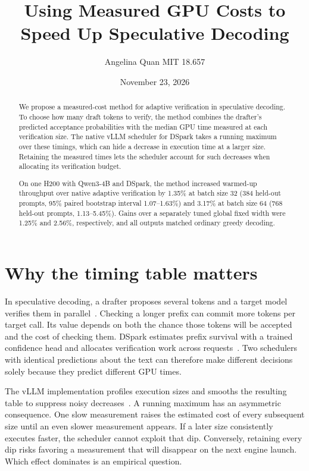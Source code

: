 \documentclass[11pt]{article}
\title{Using Measured GPU Costs to Speed Up Speculative Decoding}
\author{Angelina Quan \qquad MIT 18.657}
\date{November 23, 2026}
\begin{document}
\maketitle
\begin{abstract}
We propose a measured-cost method for adaptive verification in speculative decoding. To choose how many draft tokens to verify, the method combines the drafter's predicted acceptance probabilities with the median GPU time measured at each verification size. The native vLLM scheduler for DSpark takes a running maximum over these timings, which can hide a decrease in execution time at a larger size. Retaining the measured times lets the scheduler account for such decreases when allocating its verification budget.

On one H200 with Qwen3-4B and DSpark, the method increased warmed-up throughput over native adaptive verification by 1.35\% at batch size 32 (384 held-out prompts, 95\% paired bootstrap interval 1.07--1.63\%) and 3.17\% at batch size 64 (768 held-out prompts, 1.13--5.45\%). Gains over a separately tuned global fixed width were 1.25\% and 2.56\%, respectively, and all outputs matched ordinary greedy decoding.
\end{abstract}
\section{Why the timing table matters}
In speculative decoding, a drafter proposes several tokens and a target model verifies them in parallel~\cite{leviathan}. Checking a longer prefix can commit more tokens per target call. Its value depends on both the chance those tokens will be accepted and the cost of checking them. DSpark estimates prefix survival with a trained confidence head and allocates verification work across requests~\cite{dspark}. Two schedulers with identical predictions about the text can therefore make different decisions solely because they predict different GPU times.

The vLLM implementation profiles execution sizes and smooths the resulting table to suppress noisy decreases~\cite{native}. A running maximum has an asymmetric consequence. One slow measurement raises the estimated cost of every subsequent size until an even slower measurement appears. If a later size consistently executes faster, the scheduler cannot exploit that dip. Conversely, retaining every dip risks favoring a measurement that will disappear on the next engine launch. Which effect dominates is an empirical question.
\end{document}
